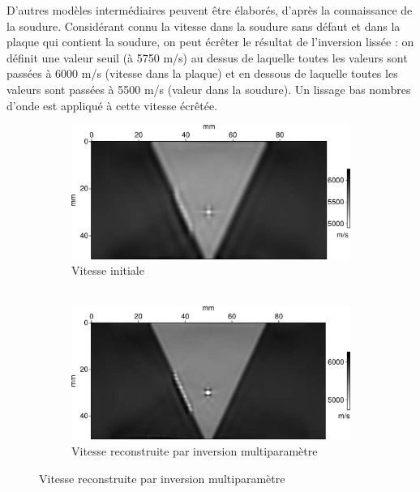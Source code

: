 \documentclass[a4paper,11pt]{report} %
\newenvironment{changemargin}[2]{\begin{list}{}{%
\setlength{\topsep}{0pt}%
\setlength{\leftmargin}{0pt}%
\setlength{\rightmargin}{0pt}%
\setlength{\listparindent}{\parindent}%
\setlength{\itemindent}{\parindent}%
\setlength{\parsep}{0pt plus 1pt}%
\addtolength{\leftmargin}{#1}%
\addtolength{\rightmargin}{#2}%
\setlength{\textwidth}{21cm}
}\item }{\end{list}}
\begin{document}
 D'autres modèles intermédiaires peuvent être élaborés, d'après la connaissance de la soudure. Considérant connu la vitesse dans la soudure sans défaut et dans la plaque qui contient la soudure, on peut écrêter le résultat de l'inversion lissée : on définit une valeur seuil (à 5750 m/s) au dessus de laquelle toutes les valeurs sont passées à 6000 m/s (vitesse dans la plaque) et en dessous de laquelle toutes les valeurs sont passées à 5500 m/s (valeur dans la soudure). Un lissage bas nombres d'onde est appliqué à cette vitesse écrêtée. 

\begin{figure}[!h]
\begin{changemargin}{-2cm}{-2cm}
	\centering
    \hspace{-1.5cm}\begin{subfigure}[b]{0.24\textwidth}
 		\includegraphics[width=\textwidth]{img/vp_smooth.png}
 		\caption{Vitesse initiale\\~\\}
	\end{subfigure}
    \begin{subfigure}[b]{0.24\textwidth}
 		\includegraphics[width=\textwidth]{img/vp_multi_6000k.png}
 		\caption{Vitesse reconstruite par inversion multiparamètre}
	\end{subfigure}

\end{changemargin}
\end{figure}
\end{document}
